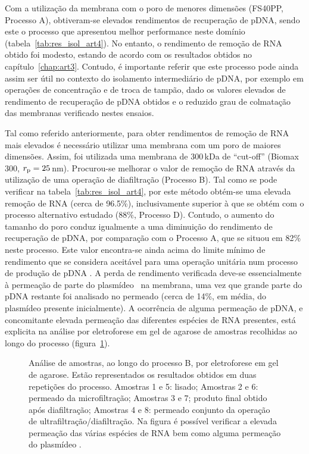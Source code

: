 Com a utilização da membrana com o poro de menores dimensões (FS40PP, Processo A), obtiveram-se elevados rendimentos de recuperação de pDNA, sendo este o processo que apresentou melhor performance neste domínio (tabela~\ref{tab:res_isol_art4}). No entanto, o rendimento de remoção de RNA obtido foi modesto, estando de acordo com os resultados obtidos no capítulo~\ref{chap:art3}. Contudo, é importante referir que este processo pode ainda assim ser útil no contexto do isolamento intermediário de pDNA, por exemplo em operações de concentração e de troca de tampão, dado os valores elevados de rendimento de recuperação de pDNA obtidos e o reduzido grau de colmatação das membranas verificado nestes ensaios.

Tal como referido anteriormente, para obter rendimentos de remoção de RNA mais elevados é necessário utilizar uma membrana com um poro de maiores dimensões. Assim, foi utilizada uma membrana de 300\,kDa de ``cut-off'' (Biomax\,300, $r_{\mathrm{p}} = 25$\,nm). Procurou-se melhorar o valor de remoção de RNA através da utilização de uma operação de diafiltração (Processo B). Tal como se pode verificar na tabela~\ref{tab:res_isol_art4}, por este método obtém-se uma elevada remoção de RNA (cerca de 96.5\%), inclusivamente superior à que se obtém com o processo alternativo estudado (88\%, Processo D).
%
Contudo, o aumento do tamanho do poro conduz igualmente a uma diminuição do rendimento de recuperação de pDNA, por comparação com o Processo A, que se situou em 82\% neste processo. Este valor encontra-se ainda acima do limite mínimo de rendimento que se considera aceitável para uma operação unitária num processo de produção de pDNA \cite{kepka,smrekar,urthaler2}.
%
A perda de rendimento verificada deve-se essencialmente à permeação de parte do plasmídeo \pVAX\ na membrana, uma vez que grande parte do pDNA restante foi analisado no permeado (cerca de 14\%, em média, do plasmídeo presente inicialmente). A ocorrência de alguma permeação de pDNA, e concomitante elevada permeação das diferentes espécies de RNA presentes, está explicita na análise por eletroforese em gel de agarose de amostras recolhidas ao longo do processo (figura~\ref{fig:ef_processoB_art4}).
% 
\begin{figure}[!t]
	\centering
	
	\caption[Análise de amostras, ao longo do processo B, por eletroforese em gel de agarose.]{Análise de amostras, ao longo do processo B, por eletroforese em gel de agarose. Estão representados os resultados obtidos em duas repetições do processo. Amostras 1 e 5: lisado; Amostras 2 e 6: permeado da microfiltração; Amostras 3 e 7; produto final obtido após diafiltração; Amostras 4 e 8: permeado conjunto da operação de ultrafiltração/diafiltração. Na figura é possível verificar a elevada permeação das várias espécies de RNA bem como alguma permeação do plasmídeo \pVAX.}
	\label{fig:ef_processoB_art4}
\end{figure}
